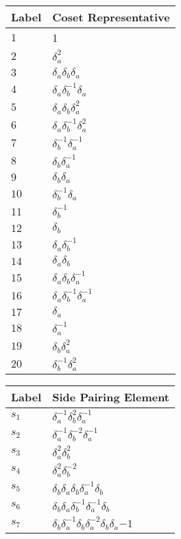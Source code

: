 \documentclass{article}
\begin{document}
\begin{center}
\begin{tabular}{ll}
\toprule
Label & Coset Representative\\
\midrule
$1$ & 1 \\
$2$ & $\delta_a^{2}$ \\
$3$ & $\delta_a^{}\delta_b^{}\delta_a^{}$ \\
$4$ & $\delta_a^{}\delta_b^{-1}\delta_a^{}$ \\
$5$ & $\delta_a^{}\delta_b^{}\delta_a^{2}$ \\
$6$ & $\delta_a^{}\delta_b^{-1}\delta_a^{2}$ \\
$7$ & $\delta_b^{-1}\delta_a^{-1}$ \\
$8$ & $\delta_b^{}\delta_a^{-1}$ \\
$9$ & $\delta_b^{}\delta_a^{}$ \\
$10$ & $\delta_b^{-1}\delta_a^{}$ \\
$11$ & $\delta_b^{-1}$ \\
$12$ & $\delta_b^{}$ \\
$13$ & $\delta_a^{}\delta_b^{-1}$ \\
$14$ & $\delta_a^{}\delta_b^{}$ \\
$15$ & $\delta_a^{}\delta_b^{}\delta_a^{-1}$ \\
$16$ & $\delta_a^{}\delta_b^{-1}\delta_a^{-1}$ \\
$17$ & $\delta_a^{}$ \\
$18$ & $\delta_a^{-1}$ \\
$19$ & $\delta_b^{}\delta_a^{2}$ \\
$20$ & $\delta_b^{-1}\delta_a^{2}$ \\
\bottomrule
\end{tabular}
\hfill
\begin{tabular}{ll}
\toprule
Label & Side Pairing Element\\
\midrule
$s_{1}$ & $\delta_a^{-1}\delta_b^{2}\delta_a^{-1}$ \\
$s_{2}$ & $\delta_a^{-1}\delta_b^{-2}\delta_a^{-1}$ \\
$s_{3}$ & $\delta_a^{2}\delta_b^{2}$ \\
$s_{4}$ & $\delta_a^{2}\delta_b^{-2}$ \\
$s_{5}$ & $\delta_b^{}\delta_a^{}\delta_b^{}\delta_a^{-1}\delta_b^{}$ \\
$s_{6}$ & $\delta_b^{}\delta_a^{}\delta_b^{-1}\delta_a^{-1}\delta_b^{}$ \\
$s_{7}$ & $\delta_b^{}\delta_a^{-1}\delta_b^{}\delta_a^{-2}\delta_b^{}\delta_a^\
{-1}$ \\

\end{tabular}
\end{center}
\end{document}

